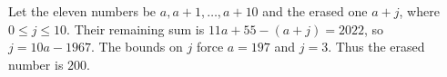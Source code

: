 Let the eleven numbers be $a,a+1,\ldots,a+10$ and the erased one $a+j$, where $0\le j\le10$. Their remaining sum is $11a+55-(a+j)=2022$, so $j=10a-1967$. The bounds on $j$ force $a=197$ and $j=3$. Thus the erased number is $\boxed{200}$.
